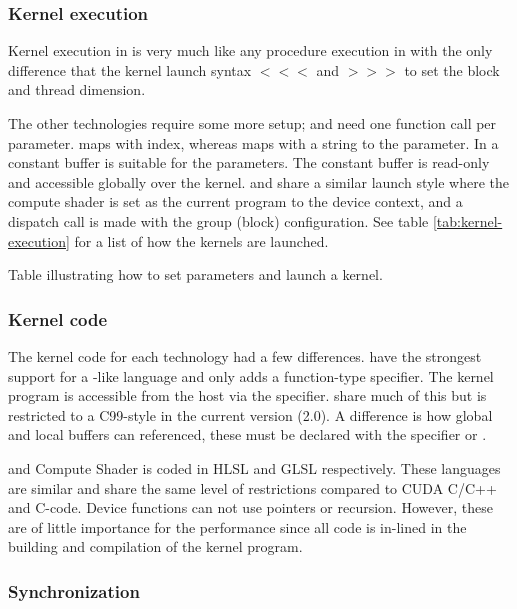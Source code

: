 \subsubsection{Kernel execution}

Kernel execution in {\CU} is very much like any procedure execution in {\CPP} with the only difference that the kernel launch syntax $<<<$ and $>>>$ to set the block and thread dimension.

The other technologies require some more setup; {\OCL} and {\GL} need one function call per parameter. {\OCL} maps with index, whereas {\GL} maps with a string to the parameter. In {\DX} a constant buffer is suitable for the parameters. The constant buffer is read-only and accessible globally over the kernel. {\DX} and {\GL} share a similar launch style where the compute shader is set as the current program to the device context, and a dispatch call is made with the group (block) configuration. See table \ref{tab:kernel-execution} for a list of how the kernels are launched.

\begin{table}[H]
	\centering
	
	\caption{Table illustrating how to set parameters and launch a kernel.}
	\label{tab:kernel-execution}
\end{table}

\subsubsection{Kernel code}

The kernel code for each technology had a few differences. {\CU} have the strongest support for a {\CPP} -like language and only adds a function-type specifier. The kernel program is accessible from the host via the  specifier. {\OCL} share much of this but is restricted to a C99-style in the current version (2.0). A difference is how global and local buffers can referenced, these must be declared with the specifier  or .

{\DX} and {\GL} Compute Shader is coded in \gls{HLSL} and \gls{GLSL} respectively. These languages are similar and share the same level of restrictions compared to CUDA C/C++ and {\OCL} C-code. Device functions can not use pointers or recursion. However, these are of little importance for the performance since all code is in-lined in the building and compilation of the kernel program.

\subsubsection{Synchronization}

